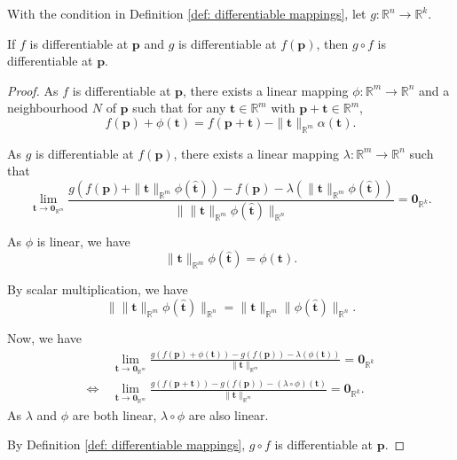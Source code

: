 \begin{theorem}
	\label{thm: differentiable mappings: composed}
	With the condition in Definition \ref{def: differentiable mappings}, let $g: \mathbb R^n \to \mathbb R^k$.
	
	If $f$ is differentiable at $\mathbf p$ and $g$ is differentiable at $f(\mathbf p)$, then $g\circ f$ is differentiable at $\mathbf p$.
	
	\begin{proof}
		As $f$ is differentiable at $\mathbf p$, there exists a linear mapping $\phi: \mathbb R^m \to \mathbb R^n$ and a neighbourhood $N$ of $\mathbf p$ such that for any $\mathbf t\in \mathbb R^m$ with $\mathbf p + \mathbf t \in \mathbb R^m$,
		$$
		f(\mathbf p) + \phi(\mathbf t) = f(\mathbf p + \mathbf t) - \|\mathbf t\|_{\mathbb R^m} \alpha(\mathbf t).
		$$
		
		As $g$ is differentiable at $f(\mathbf p)$, there exists a linear mapping $\lambda: \mathbb R^m \to \mathbb R^n$ such that
		$$
		\lim_{\mathbf t \to \mathbf 0_{\mathbb R^m}} \frac{g(f(\mathbf p) + \| \mathbf t \|_{\mathbb R^m}\phi(\mathbf{\hat t})) - f(\mathbf p) - \lambda(\| \mathbf t \|_{\mathbb R^m}\phi(\mathbf{\hat t}))}{\Big\|\|\mathbf t\|_{\mathbb R^m} \phi(\mathbf{\hat t})\Big\|_{\mathbb R^n}} = \mathbf 0_{\mathbb R^k}.
		$$
		
		As $\phi$ is linear, we have
		$$
		\| \mathbf t \|_{\mathbb R^m} \phi(\mathbf{\hat t}) = \phi(\mathbf t).
		$$
		
		By scalar multiplication, we have
		$$
		\Big\|\|\mathbf t\|_{\mathbb R^m} \phi(\mathbf{\hat t})\Big\|_{\mathbb R^n} = \| \mathbf t \|_{\mathbb R^m} \| \phi (\mathbf{\hat t}) \|_{\mathbb R^n}.
		$$
		
		Now, we have
		$$
		\begin{aligned}
			& \ \lim_{\mathbf t \to \mathbf 0_{\mathbb R^m}} \frac{g(f(\mathbf p) + \phi(\mathbf t)) - g(f(\mathbf p)) - \lambda(\phi(\mathbf t))}{\| \mathbf t \|_{\mathbb R^m}} = \mathbf 0_{\mathbb R^k} \\
			\iff & \ \lim_{\mathbf t \to \mathbf 0_{\mathbb R^m}} \frac{g(f(\mathbf p + \mathbf t)) - g(f(\mathbf p)) - (\lambda \circ \phi) (\mathbf t)}{\| \mathbf t \|_{\mathbb R^m}} = \mathbf 0_{\mathbb R^k}.
		\end{aligned}
		$$
		As $\lambda$ and $\phi$ are both linear, $\lambda \circ \phi$ are also linear.
		
		By Definition \ref{def: differentiable mappings}, $g \circ f$ is differentiable at $\mathbf p$.
	\end{proof}
\end{theorem}


